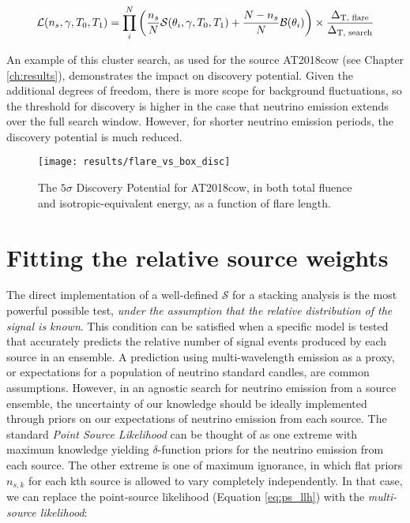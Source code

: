 \begin{equation}
\mathcal{L}(n_{s}, \gamma, T_{0}, T_{1}) = \prod_{i}^{N} \left(\frac{n_{s}}{N} \mathcal{S}(\theta_{i}, \gamma, T_{0}, T_{1}) + \frac{N - n_{s}}{N} \mathcal{B}(\theta_{i})  \right) \times \frac{\Delta_{\textup{T, flare}}}{\Delta_{\textup{T, search}}}
\end{equation}

An example of this cluster search, as used for the source AT2018cow (see Chapter \ref{ch:results}), demonstrates the impact on discovery potential. Given the additional degrees of freedom, there is more scope for background fluctuations, so the threshold for discovery is higher in the case that neutrino emission extends over the full search window. However, for shorter neutrino emission periods, the discovery potential is much reduced.

\begin{figure}[!ht]
	\centering \texttt{[image: results/flare\_vs\_box\_disc]}
	\caption{The $5\sigma$ Discovery Potential for AT2018cow, in both total fluence and isotropic-equivalent energy, as a function of flare length.}
	\label{fig:DiscTime}
\end{figure}

\section{Fitting the relative source weights}
\label{sec:fit_weights}

The direct implementation of a well-defined $\mathcal{S}$ for a stacking analysis is the most powerful possible test, \emph{under the assumption that the relative distribution of the signal is known}. This condition can be satisfied when a specific model is tested that accurately predicts the relative number of signal events produced by each source in an ensemble. A prediction using multi-wavelength emission as a proxy, or expectations for a population of neutrino standard candles, are common assumptions. However, in an agnostic search for neutrino emission from a source ensemble, the uncertainty of our knowledge should be ideally implemented through priors on our expectations of neutrino emission from each source. The standard \emph{Point Source Likelihood} can be thought of as one extreme with maximum knowledge yielding $\delta$-function priors for the neutrino emission from each source. The other extreme is one of maximum ignorance, in which flat priors $n_{s, k}$ for each kth source is allowed to vary completely independently. In that case, we can replace the point-source likelihood (Equation \ref{eq:ps_llh}) with the \emph{multi-source likelihood}:

